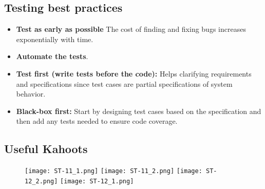 \documentclass[../ESOF_notes.tex]{subfiles}
\begin{document}
    \subsection{Testing best practices}
    \begin{itemize}
        \item \textbf{Test as early as possible} The cost of finding
        and fixing bugs increases exponentially with time.
        \item \textbf{Automate the tests}.
        \item \textbf{Test first (write tests before the code):}
        Helps clarifying requirements and specifications since
        test cases are partial specifications of system behavior.
        \item \textbf{Black-box first:} Start by designing test 
        cases based on the specification and then add any tests 
        needed to ensure code coverage.
    \end{itemize}
\pagebreak
    \subsection{Useful Kahoots}
    \begin{figure}[h!]
        \texttt{[image: ST-11\_1.png]}
        \centering
        \texttt{[image: ST-11\_2.png]}
        \texttt{[image: ST-12\_2.png]}
        \centering
        \texttt{[image: ST-12\_1.png]}
    \end{figure}
\end{document}
